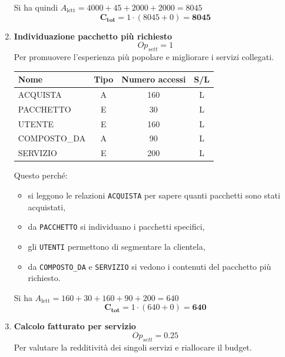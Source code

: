 \documentclass[a4paper,12pt]{report}
\begin{document}
\begin{enumerate}
	      Si ha quindi $A_{\text{lett}} = 4000 + 45 + 2000 + 2000 = 8045$
	      $$\mathbf{C_{tot}} = 1 \cdot (8045 + 0) = \mathbf{8045}$$


	\item {\large \textbf{Individuazione pacchetto più richiesto}} \label{op12}
	      $$
		      {Op}_{sett} = 1
	      $$
	      Per promuovere l'esperienza più popolare e migliorare i servizi collegati.

	      \begin{table}[H]
		      \centering
		      \small
		      \renewcommand{\arraystretch}{1.15}
		      \begin{tabularx}{0.8\textwidth}{|X|c|c|c|}
			      \hline
			      \rowcolor{gray!20}
			      \textbf{Nome} & \textbf{Tipo} & \textbf{Numero accessi} & \textbf{S/L} \\
			      \hline
			      ACQUISTA      & A             & 160                     & L            \\
			      PACCHETTO     & E             & 30                      & L            \\
			      UTENTE        & E             & 160                     & L            \\
			      COMPOSTO\_DA  & A             & 90                      & L            \\
			      SERVIZIO      & E             & 200                     & L            \\
			      \hline
		      \end{tabularx}
	      \end{table}

	      Questo perché:
	      \begin{itemize}
		      \item si leggono le relazioni \texttt{ACQUISTA} per sapere quanti pacchetti sono stati acquistati,
		      \item da \texttt{PACCHETTO} si individuano i pacchetti specifici,
		      \item gli \texttt{UTENTI} permettono di segmentare la clientela,
		      \item da \texttt{COMPOSTO\_DA} e \texttt{SERVIZIO} si vedono i contenuti del pacchetto più richiesto.
	      \end{itemize}

	      Si ha $A_{\text{lett}} = 160 + 30 + 160 + 90 + 200 = 640$
	      $$\mathbf{C_{tot}} = 1 \cdot (640 + 0) = \mathbf{640}$$


	\item {\large \textbf{Calcolo fatturato per servizio}} \label{op13}
	      $$
		      {Op}_{sett} = 0.25
	      $$
	      Per valutare la redditività dei singoli servizi e riallocare il budget.


\end{enumerate}
\end{document}
